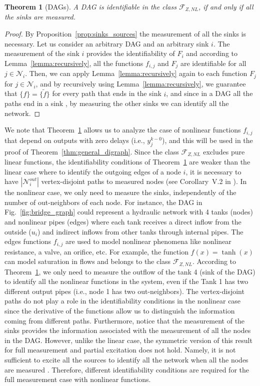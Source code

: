 \documentclass[letterpaper,10pt,journal]{IEEEtran}
\newcommand{\Ftwo}{\mathcal{F}_{Z,NL}}
\newtheorem{theorem}{Theorem}
\newcommand{\abs}[1]{\left|#1\right|}
\newcommand{\NN}{\mathcal{N}}
\begin{document}
\begin{theorem}[DAGs]\label{thm:DAG_Volterra}
A DAG is identifiable in the class $\Ftwo$, if and only if all the sinks are measured.
\end{theorem}
\begin{proof}
    By Proposition~\ref{prop:sinks_sources} the measurement of all the sinks is necessary. Let us consider an arbitrary DAG and an arbitrary sink $i$. The measurement of the sink $i$ provides the identifiability of $F_i$ and according to Lemma~\ref{lemma:recursively}, all the functions $f_{i,j}$ and $F_j$ are identifiable for all $j\in\NN_i$. Then, we can apply Lemma~\ref{lemma:recursively} again to each function $F_j$ for $j\in\NN_i$, and by recursively  using Lemma~\ref{lemma:recursively}, we guarantee that $\{ f \}=\{ \tilde f \}$ for every path that ends in the sink $i$, and since in a DAG all the paths end in a sink \cite{bang2008digraphs}, by measuring the other sinks we can identify all the network. 
\end{proof}
We note that  Theorem~\ref{thm:DAG_Volterra} allows us to analyze the case of nonlinear functions $f_{i,j}$ that depend on outputs with zero delays (i.e., $y_j^{k-0}$), and this will be used in the proof of Theorem~\ref{thm:general_digraph}.
Since the class $\Ftwo$ excludes pure linear functions, the identifiability conditions of Theorem~\ref{thm:DAG_Volterra} are weaker than the linear case where to identify the outgoing edges of a node $i$, it is necessary to have $\abs{\NN_i^{out}}$ vertex-disjoint paths to measured nodes (see Corollary~V.2 in \cite{hendrickx2019identifiability}). In the nonlinear case, we only need to measure the sinks, independently of the number of out-neighbors of each node.  For instance, the DAG in Fig.~\ref{fig:bridge_graph} could represent a hydraulic network with 4 tanks (nodes) and nonlinear pipes (edges) where each tank receives a direct inflow from the outside ($u_i$) and indirect inflows from other tanks through internal pipes. The edges functions $f_{i,j}$ are used to model nonlinear phenomena like nonlinear resistance, a valve, an orifice, etc. For example, the function $f(x)=\tanh(x)$ can model saturation in flows and belongs to the class $\Ftwo$. According to Theorem~\ref{thm:DAG_Volterra}, we only need to measure the outflow of the tank 4 (sink of the DAG) to identify all the nonlinear functions in the system, even if the Tank 1 has two different output pipes (i.e., node 1 has two out-neighbors).
The vertex-disjoint paths do not play a role in the identifiability conditions in the nonlinear case since the derivative of the functions allow us to distinguish the information coming from different paths. Furthermore, notice that the measurement of the sinks provides the information associated with the measurement of all the nodes in the DAG. However, unlike the linear case, the symmetric version of this result for full measurement and partial excitation does not hold. Namely, it is not sufficient to excite all the sources to identify all the network when all the nodes are measured \cite{vizuete2024partial}. Therefore, different identifiability conditions are required for the full measurement case with nonlinear functions.
\end{document}
